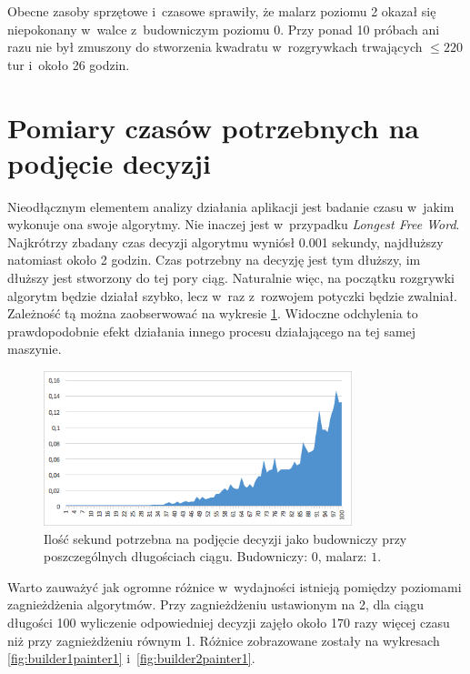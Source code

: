 \documentclass[document]{xmgr}
\begin{document}
Obecne zasoby sprzętowe i~czasowe sprawiły, że malarz poziomu 2 okazał się niepokonany w~walce z~budowniczym poziomu 0. Przy ponad 10 próbach ani razu nie był zmuszony do stworzenia kwadratu w~rozgrywkach trwających $\leq 220$ tur i~około 26 godzin.





\section{Pomiary czasów potrzebnych na podjęcie decyzji}
Nieodłącznym elementem analizy działania aplikacji jest badanie czasu w~jakim wykonuje ona swoje algorytmy. Nie inaczej jest w~przypadku \emph{Longest Free Word}. Najkrótrzy zbadany czas decyzji algorytmu wyniósł 0.001 sekundy, najdłuższy natomiast około 2 godzin. Czas potrzebny na decyzję jest tym dłuższy, im dłuższy jest stworzony do tej pory ciąg. Naturalnie więc, na początku rozgrywki algorytm będzie działał szybko, lecz w~raz z~rozwojem potyczki będzie zwalniał. Zależność tą można zaobserwować na wykresie \ref{fig:builder0painter1}. Widoczne odchylenia to prawdopodobnie efekt działania innego procesu działającego na tej samej maszynie.

\begin{figure}[tbh]
    \centering
    \includegraphics[width = 0.8\textwidth]{images/timeBuilder0Painter1}
    \caption{Ilość sekund potrzebna na podjęcie decyzji jako budowniczy przy poszczególnych długościach ciągu. Budowniczy: $0$, malarz: $1$.}
    \label{fig:builder0painter1}
\end{figure}

Warto zauważyć jak ogromne różnice w~wydajności istnieją pomiędzy poziomami zagnieżdżenia algorytmów. Przy zagnieżdżeniu ustawionym na 2, dla ciągu długości 100 wyliczenie odpowiedniej decyzji zajęło około 170 razy więcej czasu niż przy zagnieżdżeniu równym 1. Różnice zobrazowane zostały na wykresach \ref{fig:builder1painter1} i~\ref{fig:builder2painter1}.
\end{document}
